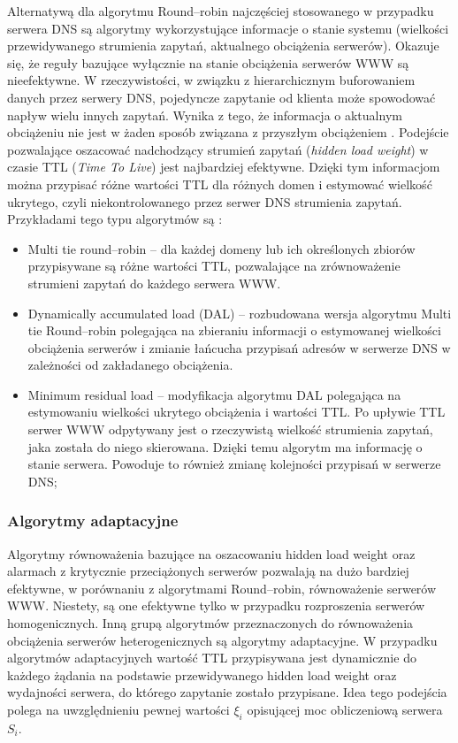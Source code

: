 Alternatywą dla algorytmu Round--robin najczęściej stosowanego w przypadku serwera DNS są algorytmy wykorzystujące informacje o 
stanie systemu (wielkości przewidywanego strumienia zapytań, aktualnego obciążenia serwerów). Okazuje się, że reguły bazujące 
wyłącznie na stanie obciążenia serwerów WWW są nieefektywne. W rzeczywistości, w związku z hierarchicznym buforowaniem danych 
przez serwery DNS, pojedyncze zapytanie od klienta może spowodować napływ wielu innych zapytań. Wynika z tego, że informacja o 
aktualnym obciążeniu nie jest w żaden sposób związana z przyszłym obciążeniem \cite{ModeleFunkcjonalne}.
Podejście pozwalające oszacować nadchodzący strumień zapytań (\emph{hidden load weight}) w czasie TTL (\emph{Time To Live}) jest najbardziej 
efektywne. Dzięki tym informacjom można przypisać różne wartości TTL dla różnych domen i estymować wielkość ukrytego, czyli 
niekontrolowanego przez serwer DNS strumienia zapytań. Przykładami tego typu algorytmów są \cite{modele14}:
\begin{itemize}
\item Multi tie round--robin -- dla każdej domeny lub ich określonych zbiorów przypisywane są różne wartości TTL, pozwalające na
zrównoważenie strumieni zapytań do każdego serwera WWW.
\item Dynamically accumulated load (DAL) -- rozbudowana wersja algorytmu Multi tie Round--robin polegająca na zbieraniu 
informacji o estymowanej wielkości obciążenia serwerów i zmianie łańcucha przypisań adresów w serwerze DNS w zależności od 
zakładanego obciążenia.
\item Minimum residual load -- modyfikacja algorytmu DAL polegająca na estymowaniu wielkości ukrytego obciążenia i wartości TTL.
Po upływie TTL serwer WWW odpytywany jest o rzeczywistą wielkość strumienia zapytań, jaka została do niego skierowana. Dzięki 
temu algorytm ma informację o stanie serwera. Powoduje to również zmianę kolejności przypisań w serwerze DNS;
\end{itemize}

\subsubsection{Algorytmy adaptacyjne}

Algorytmy równoważenia bazujące na oszacowaniu hidden load weight oraz alarmach z krytycznie przeciążonych serwerów pozwalają 
na dużo bardziej efektywne, w porównaniu z algorytmami Round--robin, równoważenie serwerów WWW. Niestety, są one efektywne 
tylko w przypadku rozproszenia serwerów homogenicznych. Inną grupą algorytmów przeznaczonych do równoważenia obciążenia 
serwerów heterogenicznych są algorytmy adaptacyjne. W przypadku algorytmów adaptacyjnych wartość TTL przypisywana jest 
dynamicznie do każdego żądania na podstawie przewidywanego hidden load weight oraz wydajności serwera, do którego zapytanie 
zostało przypisane. Idea tego podejścia polega na uwzględnieniu pewnej wartości $\xi_i$ opisującej moc obliczeniową serwera $S_i$. 

